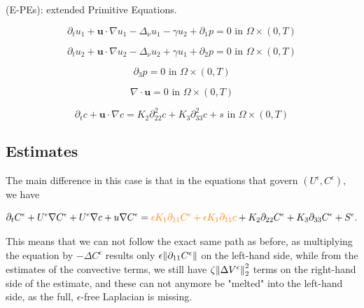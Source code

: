 \documentclass[11pt]{article}
\begin{document}
(E-PEs): extended Primitive Equations.

    \begin{equation} \label{HNSC1-dw}    
    \partial_t u_1 + \mathbf{u} \cdot \nabla u_1 - \Delta_\nu u_1 - \gamma u_2 + \partial_1 p = 0 \text{ in } \Omega \times (0,T)
    \end{equation}
    
    \begin{equation} \label{HNSC2-dw}   
    \partial_t u_2 + \mathbf{u} \cdot \nabla u_2 - \Delta_\nu u_2 + \gamma u_1 + \partial_2 p = 0 \text{ in } \Omega \times (0,T)
    \end{equation}
    
    \begin{equation} \label{HNSC3-dw}   
    \partial_3 p = 0 \text{ in } \Omega \times (0,T)
    \end{equation}
    
    \begin{equation} \label{HNSC4-dw}   
    \nabla \cdot \mathbf{u} = 0 \text{ in } \Omega \times (0,T)
    \end{equation}
    
    \begin{equation} \label{HNSC5-dw}   
    \partial_t c + \mathbf{u} \cdot \nabla c = K_2 \partial_{22} ^ 2 c + K_3 \partial_{33} ^2 c + s \text{ in } \Omega \times (0,T)
    \end{equation}
    
  \subsection{Estimates}
    
The main difference in this case is that in the equations that govern $(U^\epsilon, C^\epsilon),$ we have

$$ \partial_t C^\epsilon + U^\epsilon \nabla C^\epsilon  + U^\epsilon \nabla c+ u \nabla C^\epsilon = \textcolor{orange}{\epsilon K_1 \partial_{11} C^\epsilon + \epsilon K_1 \partial_{11} c} + K_2 \partial_{22} C^\epsilon + K_3 \partial_{33} C^\epsilon + S^\epsilon. $$

This means that we can not follow the exact same path as before, as multiplying the equation by $- \Delta C^\epsilon$ results only $\epsilon \norm{\partial_{11} C^\epsilon}$ on the left-hand side, while from the estimates of the convective terms, we still have $\zeta \norm{\Delta V^\epsilon}^2_2$ terms on the right-hand side of the estimate, and these can not anymore be "melted" into the left-hand side, as the full, $\epsilon$-free Laplacian is missing.
\end{document}
